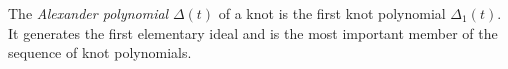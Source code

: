 The \textit{Alexander polynomial} $\Delta(t)$ of a knot is the first knot polynomial $\Delta_1(t)$. It generates the first elementary ideal and is the most important member of the sequence of knot polynomials.

